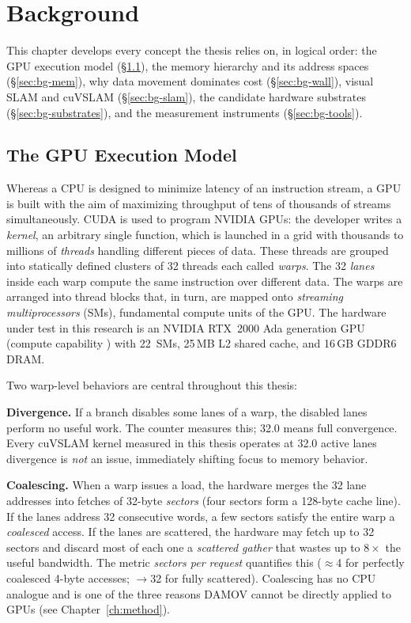 \chapter{Background}\label{ch:background}

This chapter develops every concept the thesis relies on, in logical order: the GPU execution model (\S\ref{sec:bg-gpu}), the memory hierarchy and its address spaces (\S\ref{sec:bg-mem}), why data movement dominates cost (\S\ref{sec:bg-wall}), visual SLAM and cuVSLAM (\S\ref{sec:bg-slam}), the candidate hardware substrates (\S\ref{sec:bg-substrates}), and the measurement instruments (\S\ref{sec:bg-tools}).

\section{The GPU Execution Model}
\label{sec:bg-gpu}

Whereas a CPU is designed to minimize latency of an instruction stream, a GPU is built with the aim of maximizing throughput of tens of thousands of streams simultaneously. CUDA is used to program NVIDIA GPUs: the developer writes a \emph{kernel}, an arbitrary single function, which is launched in a grid with thousands to millions of \emph{threads} handling different pieces of data. These threads are grouped into statically defined clusters of 32 threads each called \emph{warps}. The 32 \emph{lanes} inside each warp compute the same instruction over different data. The warps are arranged into thread blocks that, in turn, are mapped onto \emph{streaming multiprocessors} (SMs), fundamental compute units of the GPU. The hardware under test in this research is an NVIDIA RTX~2000 Ada generation GPU (compute capability ) with 22~SMs, 25\,MB L2 shared cache, and 16\,GB GDDR6 DRAM.

Two warp-level behaviors are central throughout this thesis:

\textbf{Divergence.} If a branch disables some lanes of a warp, the disabled lanes perform no useful work. The counter  measures this; 32.0 means full convergence. Every cuVSLAM kernel measured in this thesis operates at 32.0 active lanes divergence is \emph{not} an issue, immediately shifting focus to memory behavior.

\textbf{Coalescing.} When a warp issues a load, the hardware merges the 32 lane addresses into fetches of 32-byte \emph{sectors} (four sectors form a 128-byte cache line). If the lanes address 32 consecutive words, a few sectors satisfy the entire warp a \emph{coalesced} access. If the lanes are scattered, the hardware may fetch up to 32 sectors and discard most of each one a \emph{scattered gather} that wastes up to $8\times$ the useful bandwidth. The metric \emph{sectors per request} quantifies this ($\approx$4 for perfectly coalesced 4-byte accesses; $\rightarrow$32 for fully scattered). Coalescing has no CPU analogue and is one of the three reasons DAMOV cannot be directly applied to GPUs (see Chapter~\ref{ch:method}).

